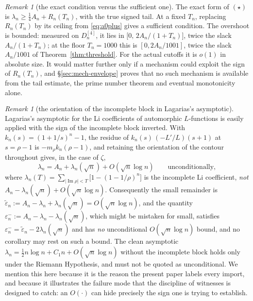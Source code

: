 \documentclass[11pt]{amsart}
\theoremstyle{definition}
\theoremstyle{remark}
\newtheorem{remark}[theorem]{Remark}
\theoremstyle{definition}
\renewcommand{\Im}{\operatorname{Im}}
\newcommand{\eps}{\varepsilon}
\begin{document}
\begin{remark}[the exact condition versus the sufficient one]\label{rmk:overshoot}
The exact form of $(\star)$ is $\lambda_n\ge\tfrac14A_n+R_n(T_n)$, with the true signed tail.
At a fixed $T_n$, replacing $R_n(T_n)$ by its ceiling from \eqref{eq:a0plus} gives a sufficient
condition. The overshoot is bounded: measured on $D_n^{[4]}$, it lies in
$\bigl[0,\,2A_n/(1+T_n)\bigr]$, twice the slack $A_n/(1+T_n)$; at the floor $T_n=1000$ this is
$[0,2A_n/1001]$, twice the slack $A_n/1001$ of Theorem~\ref{thm:threshold}.
For the actual cutoffs it is $o(1)$ in absolute size.  It would matter further only if a mechanism
could exploit the sign of $R_n(T_n)$, and
\S\ref{sec:mech-envelope} proves that no such mechanism is available from the tail estimate,
the prime number theorem and eventual monotonicity alone.
\end{remark}

\begin{remark}[the orientation of the incomplete block in Lagarias's asymptotic]\label{rmk:erratum}
Lagarias's asymptotic for the Li coefficients of
automorphic $L$-functions \cite{Lagarias2007} is easily applied with the sign of the incomplete
block inverted.
With $k_n(s)=(1+1/s)^n-1$, the residue of $k_n(s)\,(-L'/L)(s+1)$ at $s=\rho-1$ is
$-m_\rho k_n(\rho-1)$, and retaining the orientation of the contour throughout gives, in the
case of $\zeta$,
\[
   \lambda_n=A_n+\lambda_n(\sqrt n)+O(\sqrt n\log n)
   \qquad\text{unconditionally},
\]
where $\lambda_n(T)=\sum_{|\Im\rho|<T}\bigl[1-(1-1/\rho)^n\bigr]$ is the incomplete Li
coefficient, \emph{not} $A_n-\lambda_n(\sqrt n)+O(\sqrt n\log n)$. Consequently the small
remainder is $\widetilde\eps_n:=A_n-\lambda_n+\lambda_n(\sqrt n)=O(\sqrt n\log n)$, and the
quantity $\eps_n^-:=A_n-\lambda_n-\lambda_n(\sqrt n)$, which might be mistaken for
small, satisfies $\eps_n^-=\widetilde\eps_n-2\lambda_n(\sqrt n)$ and has \emph{no}
unconditional $O(\sqrt n\log n)$ bound, and no corollary may rest on such a bound.
The clean asymptotic $\lambda_n=\tfrac12n\log n+C_1n+O(\sqrt n\log n)$ without the incomplete
block holds only under the Riemann Hypothesis, and must not be quoted as unconditional. We mention this here
because it is the reason the present paper labels every import, and because it illustrates the
failure mode that the discipline of witnesses is designed to catch: an $O(\cdot)$ can hide
precisely the sign one is trying to establish.
\end{remark}

\end{document}
